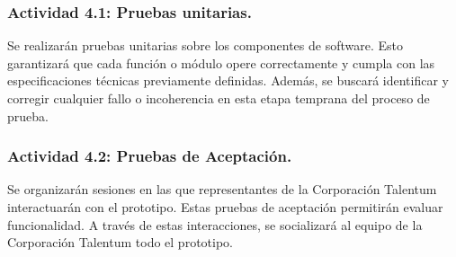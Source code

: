 \subsubsection{Actividad 4.1: Pruebas unitarias.}
Se realizarán pruebas unitarias sobre los componentes de software. Esto garantizará que cada función o módulo opere correctamente y cumpla con las especificaciones técnicas previamente definidas. Además, se buscará identificar y corregir cualquier fallo o incoherencia en esta etapa temprana del proceso de prueba.

\subsubsection{Actividad 4.2: Pruebas de Aceptación.}
Se organizarán sesiones en las que representantes de la Corporación Talentum interactuarán con el prototipo. Estas pruebas de aceptación permitirán evaluar funcionalidad. A través de estas interacciones, se socializará al equipo de la Corporación Talentum todo el prototipo.










